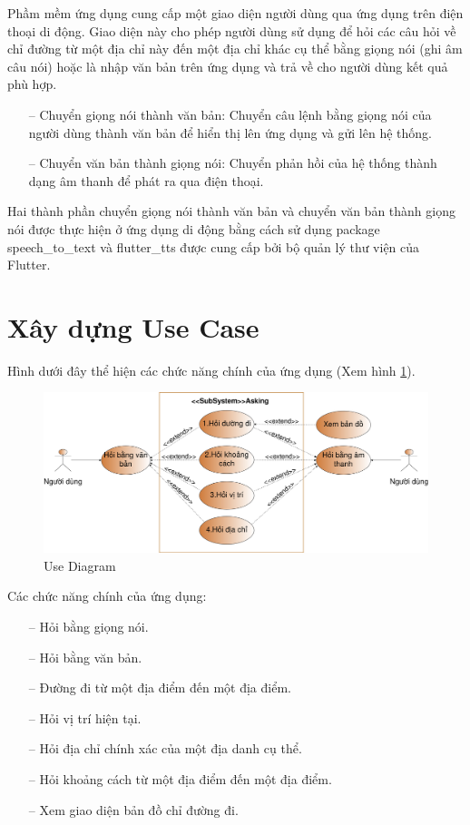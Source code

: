 Phầm mềm ứng dụng cung cấp một giao diện người dùng qua ứng dụng trên điện thoại di động. Giao diện này cho phép người dùng sử dụng để hỏi các câu hỏi về chỉ đường từ một địa chỉ này đến một địa chỉ khác cụ thể bằng giọng nói (ghi âm câu nói) hoặc là nhập văn bản trên ứng dụng và trả về cho người dùng kết quả phù hợp.
\begin{itemize}
    \item[--] Chuyển giọng nói thành văn bản: Chuyển câu lệnh bằng giọng nói của người dùng thành văn bản để hiển thị lên ứng dụng và gửi lên hệ thống.
    \item[--] Chuyển văn bản thành giọng nói: Chuyển phản hồi của hệ thống thành dạng âm thanh để phát ra qua điện thoại.
\end{itemize}

Hai thành phần chuyển giọng nói thành văn bản và chuyển văn bản thành giọng nói được thực hiện ở ứng dụng di động bằng cách sử dụng package speech\_to\_text\cite{stt} và flutter\_tts\cite{tts} được cung cấp bởi bộ quản lý thư viện của Flutter.

\section{Xây dựng Use Case}
Hình dưới đây thể hiện các chức năng chính của ứng dụng (Xem hình \ref{fig:UC}). 
\begin{figure}[H]
    \centering
    \includegraphics[width=15cm]{images/ChatbotSRS-UseCase.png}
    \caption{Use Diagram}
    \label{fig:UC}
\end{figure}

Các chức năng chính của ứng dụng:
\begin{itemize}
    \item[--] Hỏi bằng giọng nói. 
    \item[--] Hỏi bằng văn bản.
    \item[--] Đường đi từ một địa điểm đến một địa điểm.
    \item[--] Hỏi vị trí hiện tại.
    \item[--] Hỏi địa chỉ chính xác của một địa danh cụ thể.
    \item[--] Hỏi khoảng cách từ một địa điểm đến một địa điểm.
    \item[--] Xem giao diện bản đồ chỉ đường đi. 
\end{itemize}

